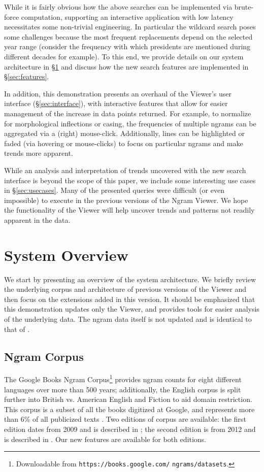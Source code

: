 \documentclass[11pt]{article}
\begin{document}
While it is fairly obvious how the above searches can be implemented via brute-force computation, supporting an interactive application with low latency necessitates some non-trivial engineering. In particular the wildcard search poses some challenges because the most frequent replacements depend on the selected year range (consider the frequency with which presidents are mentioned during different decades for example). To this end, we provide details on our system architecture in \S\ref{sec:overview}  and discuss how the new search features are implemented in \S\ref{sec:features}.

In addition, this demonstration presents an overhaul of the Viewer's user interface (\S\ref{sec:interface}), with interactive features that allow for easier management of the increase in data points returned. For example, to normalize for morphological inflections or casing, the frequencies of multiple ngrams can be aggregated via a (right) mouse-click. Additionally, lines can be highlighted or faded (via hovering or mouse-clicks) to focus on particular ngrams and make trends more apparent.


While an analysis and interpretation of trends uncovered with the new search interface is beyond the scope of this paper, we include some interesting use cases in \S\ref{sec:usecases}. Many of the presented queries were difficult (or even impossible) to execute in the previous versions of the Ngram Viewer. We hope the functionality of the Viewer will help uncover trends and patterns not readily apparent in the data.


\section{System Overview}
\label{sec:overview}

We start by presenting an overview of the system architecture. We briefly review the underlying corpus and architecture of previous versions of the Viewer \cite{culturomics,lin2012syntactic} and then focus on the extensions added in this version. It should be emphasized that this demonstration updates only the Viewer, and provides tools for easier analysis of the underlying data. The ngram data itself is not updated and is identical to that of .


\subsection{Ngram Corpus}
	The Google Books Ngram Corpus\footnote{Downloadable from \texttt{https://books.google.com/} \texttt{ngrams/datasets}.} provides ngram counts for eight different languages over more than 500 years; additionally, the English corpus is split further into British vs. American English and Fiction to aid domain restriction. This corpus is a subset of all the books digitized at Google, and represents more than 6\% of all publicized texts \cite{lin2012syntactic}. Two editions of corpus are available: the first edition dates from 2009 and is described in ; the second edition is from 2012 and is described in . Our new features are available for both editions.
\end{document}
